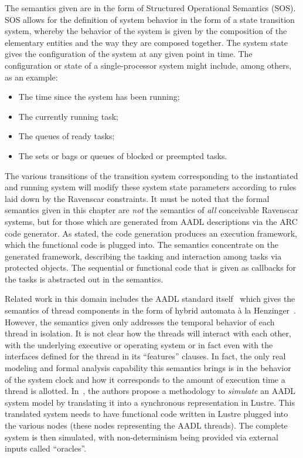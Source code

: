 The semantics given are in the form of Structured Operational
Semantics (SOS). SOS allows for the definition of system behavior in
the form of a state transition system, whereby the behavior of the
system is given by the composition of the elementary entities and the
way they are composed together. The system state gives the
configuration of the system at any given point in time. The
configuration or state of a single-processor system might include,
among others, as an example:

\begin{itemize}
\item{The time since the system has been running;}
\item{The currently running task;}
\item{The queues of ready tasks;}
\item{The sets or bags or queues of blocked or preempted tasks.}
\end{itemize}

The various transitions of the transition system corresponding to the
instantiated and running system will modify these system state
parameters according to rules laid down by the Ravenscar
constraints. It must be noted that the formal semantics given in this
chapter are \emph{not} the semantics of \emph{all} conceivable
Ravenscar systems, but for those which are generated from AADL
descriptions via the ARC code generator. As stated, the code
generation produces an execution framework, which the functional code
is plugged into. The semantics concentrate on the generated framework,
describing the tasking and interaction among tasks via protected
objects. The sequential or functional code that is given as callbacks
for the tasks is abstracted out in the semantics.

Related work in this domain includes the AADL standard
itself~\cite{AS5506} which gives the semantics of thread components in
the form of hybrid automata \`a la
Henzinger~\cite{henzinger@slcs96}. However, the semantics given only
addresses the temporal behavior of each thread in isolation. It is not
clear how the threads will interact with each other, with the
underlying executive or operating system or in fact even with the
interfaces defined for the thread in its ``features'' clauses. In
fact, the only real modeling and formal analysis capability this
semantics brings is in the behavior of the system clock and how it
corresponds to the amount of execution time a thread is
allotted. In~\cite{halbwachs@emsoft07}, the authors propose a
methodology to \emph{simulate} an AADL system model by translating it
into a synchronous representation in Lustre. This translated system
needs to have functional code written in Lustre plugged into the
various nodes (these nodes representing the AADL threads). The
complete system is then simulated, with non-determinism being provided
via external inputs called ``oracles''.

